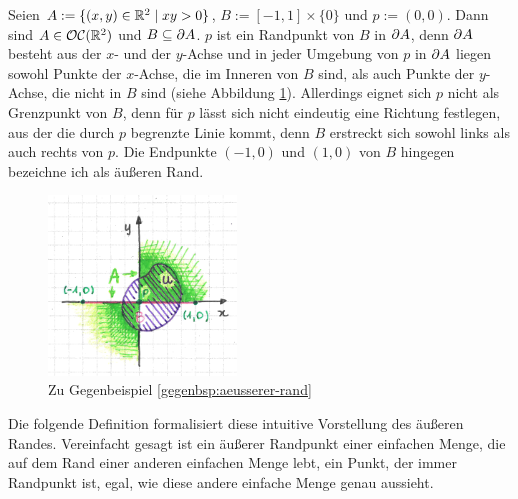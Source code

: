     \begin{gegenbsp}\label{gegenbsp:aeusserer-rand}
        Seien $A := \{(x,y) \in \mathbb{R}^2 \mid xy > 0\}$, $B := [-1,1] \times \{0\}$ und $p := (0,0)$. 
        Dann sind $A \in \mathcal{OC}(\mathbb{R}^2)$ und $B \subseteq \partial A$.
        $p$ ist ein Randpunkt von $B$ in $\partial A$, denn $\partial A$ besteht aus der $x$- und der $y$-Achse und in jeder Umgebung von $p$ in $\partial A$ liegen sowohl Punkte der $x$-Achse, die im Inneren von $B$ sind, als auch Punkte der $y$-Achse, die nicht in $B$ sind (siehe Abbildung \ref{fig:kein-aeusserer-rand}).
        Allerdings eignet sich $p$ nicht als Grenzpunkt von $B$, denn für $p$ lässt sich nicht eindeutig eine Richtung festlegen, \glqq aus der die durch $p$ begrenzte Linie kommt\grqq, denn $B$ erstreckt sich sowohl links als auch rechts von $p$.
        Die Endpunkte $(-1,0)$ und $(1,0)$ von $B$ hingegen bezeichne ich als äußeren Rand.
    \end{gegenbsp}
    
    \begin{figure}[ht]
        \centering
        \includegraphics[width=5cm]{abb/kein-aeusserer-rand.png}
        \caption{Zu Gegenbeispiel \ref{gegenbsp:aeusserer-rand}}
        \label{fig:kein-aeusserer-rand}
    \end{figure}

    Die
    folgende Definition formalisiert diese intuitive Vorstellung des äußeren Randes.
    Vereinfacht gesagt ist ein äußerer Randpunkt einer einfachen Menge, die auf dem Rand einer anderen einfachen Menge \glqq lebt\grqq, ein Punkt, der immer Randpunkt ist, egal, wie diese andere einfache Menge genau aussieht.

